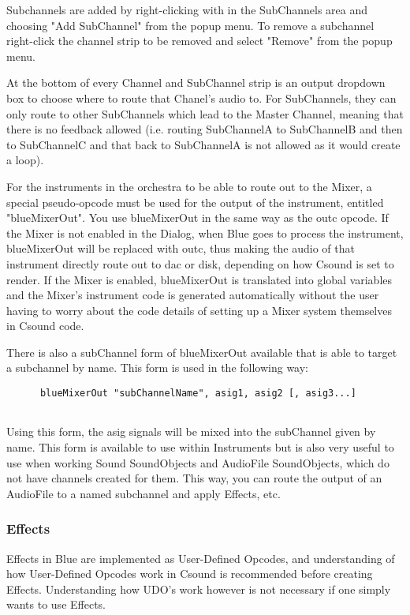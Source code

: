 Subchannels are added by right-clicking with in the SubChannels area and
choosing "Add SubChannel" from the popup menu. To remove a subchannel
right-click the channel strip to be removed and select "Remove" from the
popup menu.

At the bottom of every Channel and SubChannel strip is an output
dropdown box to choose where to route that Chanel's audio to. For
SubChannels, they can only route to other SubChannels which lead to the
Master Channel, meaning that there is no feedback allowed (i.e. routing
SubChannelA to SubChannelB and then to SubChannelC and that back to
SubChannelA is not allowed as it would create a loop).

For the instruments in the orchestra to be able to route out to the
Mixer, a special pseudo-opcode must be used for the output of the
instrument, entitled "blueMixerOut". You use blueMixerOut in the same
way as the outc opcode. If the Mixer is not enabled in the Dialog, when
Blue goes to process the instrument, blueMixerOut will be replaced with
outc, thus making the audio of that instrument directly route out to dac
or disk, depending on how Csound is set to render. If the Mixer is
enabled, blueMixerOut is translated into global variables and the
Mixer's instrument code is generated automatically without the user
having to worry about the code details of setting up a Mixer system
themselves in Csound code.

There is also a subChannel form of blueMixerOut available that is able
to target a subchannel by name. This form is used in the following way:

\begin{verbatim}
      blueMixerOut "subChannelName", asig1, asig2 [, asig3...]
    
\end{verbatim}

Using this form, the asig signals will be mixed into the subChannel
given by name. This form is available to use within Instruments but is
also very useful to use when working Sound SoundObjects and AudioFile
SoundObjects, which do not have channels created for them. This way, you
can route the output of an AudioFile to a named subchannel and apply
Effects, etc.

\subsubsection{Effects}

Effects in Blue are implemented as User-Defined Opcodes, and
understanding of how User-Defined Opcodes work in Csound is recommended
before creating Effects. Understanding how UDO's work however is not
necessary if one simply wants to use Effects.

